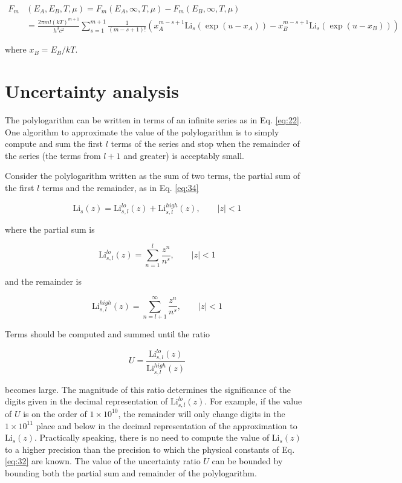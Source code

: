 \documentclass[letterpaper,12pt]{article}
\newcommand{\Li}{\textrm{Li}}
\begin{document}
\begin{align} \label{eq:33}
F_{m}&(E_{A}, E_{B}, T, \mu) = F_{m}(E_{A}, \infty, T, \mu) - F_{m}(E_{B}, \infty, T, \mu) \nonumber \\
 &= \frac{2\pi m! (kT)^{m+1}}{h^{3} c^{2}} \sum_{s = 1}^{m+1} \frac{1}{(m-s+1)!} \left( x_{A}^{m-s+1} \Li_{s} \left( \exp(u-x_{A}) \right) - x_{B}^{m-s+1} \Li_{s} \left( \exp(u-x_{B}) \right)
\right)
\end{align}

\noindent where $x_{B} = E_{B}/kT$.


\section{Uncertainty analysis}
The polylogarithm can be written in terms of an infinite series as in Eq. \ref{eq:22}. One algorithm to approximate the value of the polylogarithm is to simply compute and sum the first $l$ terms of the series and stop when the remainder of the series (the terms from $l+1$ and greater) is acceptably small.

Consider the polylogarithm written as the sum of two terms, the partial sum of the first $l$ terms and the remainder, as in Eq. \ref{eq:34}

\begin{equation} \label{eq:34}
\Li_{s}(z) = \Li_{s,l}^{lo}(z) + \Li_{s,l}^{high}(z), \qquad |z| < 1
\end{equation}

\noindent where the partial sum is

\begin{equation} \label{eq:35}
\Li_{s,l}^{lo}(z) = \sum_{n = 1}^{l} \frac{z^{n}}{n^{s}}, \qquad |z| < 1
\end{equation}

\noindent and the remainder is

\begin{equation} \label{eq:36}
\Li_{s,l}^{high}(z) = \sum_{n = l + 1}^{\infty} \frac{z^{n}}{n^{s}}, \qquad |z| < 1
\end{equation}


\noindent Terms should be computed and summed until the ratio

\begin{equation} \label{eq:37}
U = \frac{\Li_{s,l}^{lo}(z)}{\Li_{s,l}^{high}(z)}
\end{equation}

\noindent becomes large. The magnitude of this ratio determines the significance of the digits given in the decimal representation of $\Li_{s,l}^{lo}(z)$. For example, if the value of $U$ is on the order of $1 \times 10^{10}$, the remainder will only change digits in the $1 \times 10^{11}$ place and below in the decimal representation of the approximation to $\Li_{s}(z)$. Practically speaking, there is no need to compute the value of $\Li_{s}(z)$ to a higher precision than the precision to which the physical constants of Eq. \ref{eq:32} are known. The value of the uncertainty ratio $U$ can be bounded by bounding both the partial sum and remainder of the polylogarithm.
\end{document}

